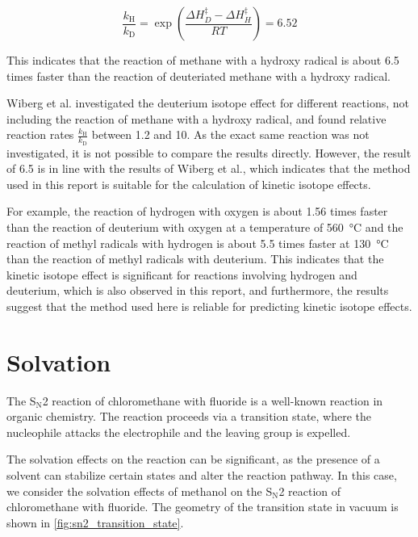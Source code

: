 \documentclass[fontsize=11pt,a4paper,oneside]{scrartcl}
\begin{document}
\begin{equation}
    \frac{k_\mathrm{H}}{k_\mathrm{D}} = \exp\left(\frac{\Delta H_D^{\ddagger} - \Delta H_H^{\ddagger}}{RT}\right) = 6.52
\end{equation}

This indicates that the reaction of methane with a hydroxy radical is about 6.5 times faster than the reaction of deuteriated methane with a hydroxy radical.

Wiberg et al.\autocite{Wiberg1955} investigated the deuterium isotope effect for different reactions, not including the reaction of methane with a hydroxy radical, and found relative reaction rates $ \frac{k_\mathrm{H}}{k_\mathrm{D}}$ between 1.2 and 10. As the exact same reaction was not investigated, it is not possible to compare the results directly. However, the result of 6.5 is in line with the results of Wiberg et al.\autocite{Wiberg1955}, which indicates that the method used in this report is suitable for the calculation of kinetic isotope effects.

For example, the reaction of hydrogen with oxygen is about 1.56 times faster than the reaction of deuterium with oxygen at a temperature of 560~\si{\degreeCelsius} and the reaction of methyl radicals with hydrogen is about 5.5 times faster at 130~\si{\degreeCelsius} than the reaction of methyl radicals with deuterium.\autocite{Wiberg1955} This indicates that the kinetic isotope effect is significant for reactions involving hydrogen and deuterium, which is also observed in this report, and furthermore, the results suggest that the method used here is reliable for predicting kinetic isotope effects.

\clearpage
\section{Solvation}

The S$_\mathrm{N}$2 reaction of chloromethane with fluoride is a well-known reaction in organic chemistry. The reaction proceeds via a transition state, where the nucleophile attacks the electrophile and the leaving group is expelled.

The solvation effects on the reaction can be significant, as the presence of a solvent can stabilize certain states and alter the reaction pathway. In this case, we consider the solvation effects of methanol on the S$_\mathrm{N}$2 reaction of chloromethane with fluoride. The geometry of the transition state in vacuum is shown in \autoref{fig:sn2_transition_state}.
\end{document}
